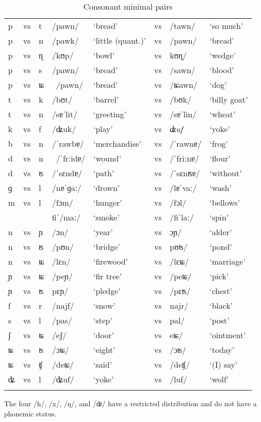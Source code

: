 \begin{table}[t]
\caption{Consonant minimal pairs}
\label{cmp}
 \begin{tabular}{llllllll}
 \lsptoprule
p&vs&t& /pawn/&`bread'&vs& /tawn/ &`so much'\\
p&vs&n& /pawk/&`little (quant.)'&vs& /pawn/ &`bread' \\
p&vs&ɳ& /kʊp/&`bowl'&vs&\/kʊɳ/ & `wedge' \\
p&vs&s& /pawn/&`bread'&vs& /sawn/ & `blood' \\
p&vs&ʨ&\ /pawn/&`bread'&vs& /ʨawn/ & `dog' \\
t&vs&k&  /bʊt/&`barrel'&vs& /bʊk/ & `billy goat' \\
t&vs&n& /sɐˈlit/&`greeting'&vs& /sɐˈlin/ & `wheat' \\
k&vs&f& /ʥuk/&`play'&vs&\textit{ʥuf}&`yoke'\\
b&vs&n& /ˈrawbɐ/&`merchandise'&vs& /ˈrawnɐ/ & `frog'\\
d&vs&n&\ /ˈfrːidɐ/&`wound'&vs&/ˈfriːnɐ/ & `flour'\\
d&vs&ʦ& /ˈsɛndɐ/&`path'&vs& /ˈsɛnʦɐ/ & `without'\\
ɡ & vs & l & /nɐˈɡaː/ & `drown' & vs & /lɐˈvaː/ & `wash'\\
m&vs&l& /fɔm/ & `hunger' & vs & /fɔl/ & `bellows'\\
&&& fiˈ/maː/& `smoke' & vs& /fiˈlaː/& `spin'\\
n&vs&ɲ& /ɔn/&`year'&vs&\/ɔɲ/ &`alder'\\
n&vs&ʦ& /pʊn/&`bridge'&vs&\/pʊʦ/&`pond'\\
n&vs&ʨ& /lɛn/&`firewood'&vs&/lɛʨ/&`marriage'\\
ɲ&vs&ʨ&/peɲ/&`fir tree'&vs&/peʨ/ & `pick'\\
ɲ&vs&ʦ& pɛɲ/&`pledge'&vs&/pɛʦ/&`chest'\\
f&vs&r&  /najf/ &`snow'&vs&\/najr/ &`black'\\
s&vs&l&  /pas/&`step'&vs&\/pal/&`post'\\
ʃ&vs&ʨ& /eʃ/&`door'&vs &\/eʨ/&`ointment'\\
ʨ&vs&ʦ& /ɔʨ/&`eight'&vs&/ɔʦ/&`today'\\
ʨ&vs&ʧ& /deʨ/&`said'&vs&/deʧ/&`(I) say'\\
ʥ&vs&l& /ʥuf/&`yoke'&vs&/luf/ & `wolf'\\
  \lspbottomrule
 \end{tabular}
\end{table}


The four  /h/, /x/, /ŋ/, and /ʣ/ have a restricted distribution and do not have a phonemic status.

